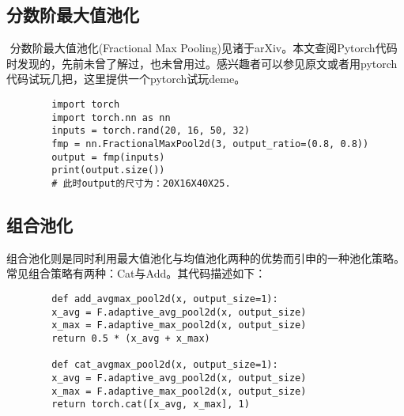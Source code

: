     \subsection{分数阶最大值池化}
    
    ​ 分数阶最大值池化(Fractional Max Pooling)见诸于arXiv\cite{RN8}。本文查阅Pytorch代码时发现的，先前未曾了解过，也未曾用过。感兴趣者可以参见原文或者用pytorch代码试玩几把，这里提供一个pytorch试玩deme。
    

    \begin{lstlisting}
        import torch
        import torch.nn as nn
        inputs = torch.rand(20, 16, 50, 32)
        fmp = nn.FractionalMaxPool2d(3, output_ratio=(0.8, 0.8))
        output = fmp(inputs)
        print(output.size())
        # 此时output的尺寸为：20X16X40X25.
    \end{lstlisting}

    \subsection{组合池化}
    
    ​组合池化则是同时利用最大值池化与均值池化两种的优势而引申的一种池化策略。常见组合策略有两种：Cat与Add。其代码描述如下：
    
    \begin{lstlisting}
        def add_avgmax_pool2d(x, output_size=1):
        x_avg = F.adaptive_avg_pool2d(x, output_size)
        x_max = F.adaptive_max_pool2d(x, output_size)
        return 0.5 * (x_avg + x_max)
        
        def cat_avgmax_pool2d(x, output_size=1):
        x_avg = F.adaptive_avg_pool2d(x, output_size)
        x_max = F.adaptive_max_pool2d(x, output_size)
        return torch.cat([x_avg, x_max], 1)
    \end{lstlisting}